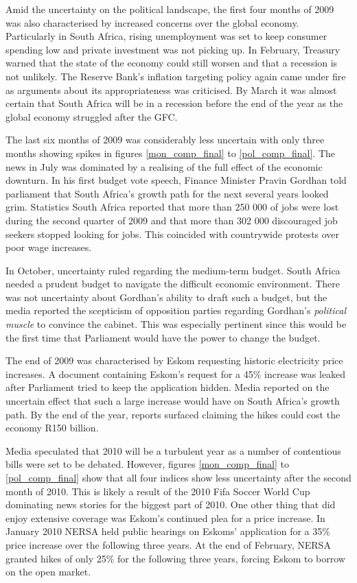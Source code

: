 \documentclass[11pt,preprint, authoryear]{elsarticle}
\numberwithin{equation}{section}
\numberwithin{figure}{section}
\numberwithin{table}{section}
\begin{document}
Amid the uncertainty on the political landscape, the first four months
of 2009 was also characterised by increased concerns over the global
economy. Particularly in South Africa, rising unemployment was set to
keep consumer spending low and private investment was not picking up. In
February, Treasury warned that the state of the economy could still
worsen and that a recession is not unlikely. The Reserve Bank's
inflation targeting policy again came under fire as arguments about its
appropriateness was criticised. By March it was almost certain that South
Africa will be in a recession before the end of the year as the global
economy struggled after the GFC.

The last six months of 2009 was considerably less uncertain with only
three months showing spikes in figures \ref{mon_comp_final} to
\ref{pol_comp_final}. The news in July was dominated by a realising of
the full effect of the economic downturn. In his first budget vote
speech, Finance Minister Pravin Gordhan told parliament that South
Africa's growth path for the next several years looked grim. Statistics South
Africa reported that more than 250 000 of jobs were lost during the
second quarter of 2009 and that more than 302 000 discouraged job
seekers stopped looking for jobs. This coincided with countrywide
protests over poor wage increases.

In October, uncertainty ruled regarding the medium-term budget. South
Africa needed a prudent budget to navigate the difficult economic
environment. There was not uncertainty about Gordhan's ability to draft
such a budget, but the media reported the scepticism of opposition
parties regarding Gordhan's \emph{political muscle} to convince the
cabinet. This was especially pertinent since this would be the first
time that Parliament would have the power to change the budget.

The end of 2009 was characterised by Eskom requesting historic
electricity price increases. A document containing Eskom's request for a
45\% increase was leaked after Parliament tried to keep the application
hidden. Media reported on the uncertain effect that such a large
increase would have on South Africa's growth path. By the end of the
year, reports surfaced claiming the hikes could cost the economy R150
billion.

Media speculated that 2010 will be a turbulent year as a number of
contentious bills were set to be debated. However, figures
\ref{mon_comp_final} to \ref{pol_comp_final} show that all four indices
show less uncertainty after the second month of 2010. This is likely a
result of the 2010 Fifa Soccer World Cup dominating news stories for the
biggest part of 2010. One other thing that did enjoy extensive coverage
was Eskom's continued plea for a price increase. In January 2010 NERSA
held public hearings on Eskoms' application for a 35\% price increase
over the following three years. At the end of February, NERSA granted
hikes of only 25\% for the following three years, forcing Eskom to
borrow on the open market.
\end{document}
